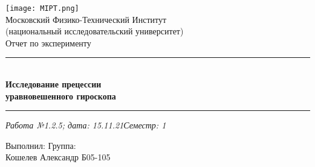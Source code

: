 \documentclass[12pt,a4paper]{scrartcl}
\begin{document}
	\graphicspath{{C:/Users/Alex/OneDrive/Изображения/TexImgs}}
	
	\newcommand{\ms}{\mathstrut}
	\newcommand{\msp}{\hspace{0.5cm}}
	\newcommand{\al}{\alpha}
	\newcommand{\dg}{^\circ}
	\newcommand{\qd}[2]{^{\frac{#1}{#2}}}
	\newcommand{\qdm}[2]{^{-\frac{#1}{#2}}}
	\newcommand{\lm}[2]{\underset{#1 \rightarrow #2}{\lim}}
	\newcommand{\sfrac}[2]{\dfrac{\strut #1}{\strut #2}}
	\newcommand{\equal}[1]{\overset{(#1)}{=}}
	\newcommand{\linevdots}{\ \raisebox{-.08\height}{\vdots}\ }
	\newcommand{\linecvdots}{\ \raisebox{-.08\height}{\vdots}\hspace{-0.13cm}\raisebox{.15\height}{\cancel{\phantom{a}}\hspace{0.06cm}}}
	\newcommand{\combox}[1]{\ms \msp \msp \begin{minipage}{0.95\linewidth}
			#1
	\end{minipage}}
	
	\newtheorem{pr}{Задача}
	\newtheorem{ex}{Пример}
	\newtheorem{dfn}{Def}
	\newtheorem{theorem}{Th}
	
	\newenvironment{slv}{\ms \msp \textit{Решение:}}{}
	\newenvironment{proof}{\ms \msp \textit{Доказательство: }}{\hfill $\square$}
	
	\begin{titlepage}
		
		\vspace*{\fill}
		
		\begin{center}
			\texttt{[image: MIPT.png]}
			\\[0.7cm]\Huge Московский Физико-Технический Институт\\(национальный исследовательский университет)
			\\[2cm]\LARGE Отчет по эксперименту
			\\[0.5cm]\noindent\rule{\textwidth}{1pt}
			\\\Huge\textbf{Исследование прецессии\\уравновешенного гироскопа}
			\\[-0.5cm]\noindent\rule{\textwidth}{1pt}
		\end{center}
		
		\begin{flushleft}
			\textit{Работа №1.2.5; дата: 15.11.21}\hfill\textit{Семестр: 1}
		\end{flushleft}
		
		\vspace*{\fill}
		
		\begin{flushleft}
			Выполнил: \hspace{\fill} Группа:
			\\Кошелев Александр \hspace{\fill} Б05-105
		\end{flushleft}
	\end{titlepage}
	
\end{document}
